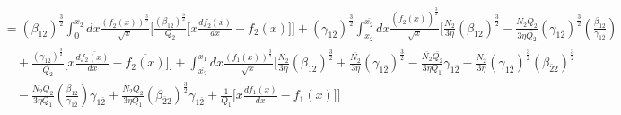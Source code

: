 \documentclass[fleqn, 10pt]{article}
\begin{document}
 \begin{equation*}
 \begin{split}
     &= (\beta_{12})^\frac{3}{2} \int^{x_2}_0 dx \frac{(f_2(x))^\frac{3}{2}}{\sqrt{x}} \biggl[ \frac{(\beta_{12})^\frac{3}{2}}{Q_2} \biggl[ x \frac{df_2(x)}{dx} - f_2(x) \biggr] \biggr] + (\gamma_{1\overline{2}})^\frac{3}{2} \int^{\overline{x_{2}}}_{x_2} dx \frac{(\overline{f_{2}(x)})^\frac{3}{2}}{\sqrt{x}} \Biggl[\frac{N_2}{3 \eta} (\beta_{12})^\frac{3}{2} - \frac{N_2 Q_2}{3 \eta \overline{Q_{2}}} (\gamma_{1\overline{2}})^\frac{3}{2} \left( \frac{\beta_{12}}{\gamma_{1\overline{2}}}\right) \\ & \quad + \frac{(\gamma_{1\overline{2}})^\frac{3}{2}}{\overline{Q_{2}}}  \biggl[x \frac{d\overline{f_{2}(x)}}{dx} - \overline{f_{2}(x)} \biggr] \Biggr] + \int^{x_1}_{\overline{x_{2}}} dx \frac{(f_1(x))^\frac{3}{2}}{\sqrt{x}} \Biggl[ \frac{N_2}{3 \eta} (\beta_{12})^\frac{3}{2} + \frac{\overline{N_{2}}}{3 \eta} (\gamma_{1\overline{2}})^\frac{3}{2} - \frac{\overline{N_{2}} \overline{Q_{2}}}{3 \eta Q_1} \gamma_{1\overline{2}} - \frac{N_2}{3 \eta} (\gamma_{1\overline{2}})^\frac{3}{2} (\beta_{\overline{2}2})^\frac{3}{2} \\ & \quad - \frac{N_2 Q_2}{3 \eta Q_1} \left( \frac{\beta_{12}}{\gamma_{1\overline{2}}}\right) \gamma_{1\overline{2}}  + \frac{N_2 \overline{Q_{2}}}{3 \eta Q_1} (\beta_{\overline{2}2})^\frac{3}{2} \gamma_{1\overline{2}} + \frac{1}{Q_1} \biggl[ x \frac{df_1(x)}{dx} - f_1(x) \biggr] \Biggr] 
     \end{split}
 \end{equation*}
\end{document}
